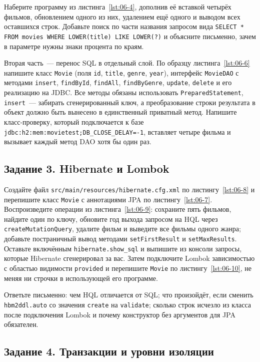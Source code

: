 Наберите программу из листинга~\ref{lst:06-4}, дополнив её вставкой четырёх
фильмов, обновлением одного из них, удалением ещё одного и выводом всех
оставшихся строк. Добавьте поиск по части названия запросом вида
\texttt{SELECT * FROM movies WHERE LOWER(title) LIKE LOWER(?)} и объясните
письменно, зачем в параметре нужны знаки процента по краям.

Вторая часть~--- перенос SQL в отдельный слой. По образцу
листинга~\ref{lst:06-6} напишите класс \texttt{Movie} (поля \texttt{id},
\texttt{title}, \texttt{genre}, \texttt{year}), интерфейс \texttt{MovieDAO} с
методами \texttt{insert}, \texttt{findById}, \texttt{findAll},
\texttt{findByGenre}, \texttt{update}, \texttt{delete} и его реализацию на
JDBC. Все методы обязаны использовать \texttt{PreparedStatement},
\texttt{insert}~--- забирать сгенерированный ключ, а преобразование строки
результата в объект должно быть вынесено в единственный приватный метод.
Напишите класс-проверку, который подключается к базе
\texttt{jdbc:h2:mem:movietest;DB\_CLOSE\_DELAY=-1}, вставляет четыре фильма и
вызывает каждый метод DAO хотя бы один раз.

\subsection*{Задание 3. Hibernate и Lombok}

Создайте файл \texttt{src/main/resources/hibernate.cfg.xml} по
листингу~\ref{lst:06-8} и перепишите класс \texttt{Movie} с аннотациями JPA по
листингу~\ref{lst:06-7}. Воспроизведите операции из листинга~\ref{lst:06-9}:
сохраните пять фильмов, найдите один по ключу, обновите год выхода запросом на
HQL через \texttt{createMutationQuery}, удалите фильм и выведите все фильмы
одного жанра; добавьте постраничный вывод методами \texttt{setFirstResult} и
\texttt{setMaxResults}. Оставьте включённым \texttt{hibernate.show\_sql} и
выпишите из консоли запросы, которые Hibernate сгенерировал за вас. Затем
подключите Lombok зависимостью с областью видимости \texttt{provided} и
перепишите \texttt{Movie} по листингу~\ref{lst:06-10}, не меняя ни строчки в
использующей его программе.

Ответьте письменно: чем HQL отличается от SQL; что произойдёт, если сменить
\texttt{hbm2ddl.auto} со значения \texttt{create} на \texttt{validate};
сколько строк исчезло из класса после подключения Lombok и почему конструктор
без аргументов для JPA обязателен.

\subsection*{Задание 4. Транзакции и уровни изоляции}

